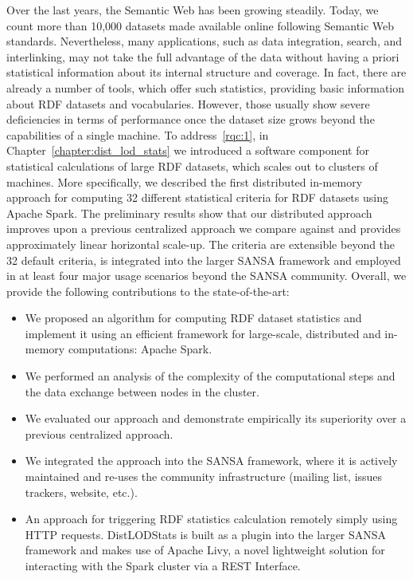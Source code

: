Over the last years, the Semantic Web has been growing steadily. 
Today, we count more than 10,000 datasets made available online following Semantic Web standards.
Nevertheless, many applications, such as data integration, search, and interlinking, may not take the full advantage of the data without having a priori statistical information about its internal structure and coverage.
In fact, there are already a number of tools, which offer such statistics, providing basic information about \gls{RDF} datasets and vocabularies.
However, those usually show severe deficiencies in terms of performance once the dataset size grows beyond the capabilities of a single machine.
To address~\ref{rqc:1}, in Chapter~\ref{chapter:dist_lod_stats} we introduced a software component for statistical calculations of large \gls{RDF} datasets, which scales out to clusters of machines.
More specifically, we described the first distributed in-memory approach for computing 32 different statistical criteria for \gls{RDF} datasets using Apache Spark.
The preliminary results show that our distributed approach improves upon a previous centralized approach we compare against and provides approximately linear horizontal scale-up. 
The criteria are extensible beyond the 32 default criteria, is integrated into the larger SANSA framework and employed in at least four major usage scenarios beyond the SANSA community.
Overall, we provide the following contributions to the state-of-the-art:

\begin{itemize}
    \item We proposed an algorithm for computing \gls{RDF} dataset statistics and implement it using an efficient framework for large-scale, distributed and in-memory computations: Apache Spark.
    \item We performed an analysis of the complexity of the computational steps and the data exchange between nodes in the cluster. 
    \item We evaluated our approach and demonstrate empirically its superiority over a previous centralized approach.
    \item We integrated the approach into the SANSA framework, where it is actively maintained and re-uses the community infrastructure (mailing list, issues trackers, website, etc.).
    \item An approach for triggering \gls{RDF} statistics calculation remotely simply using HTTP requests. 
    DistLODStats is built as a plugin into the larger SANSA framework and makes use of Apache Livy, a novel lightweight solution for interacting with the Spark cluster via a REST Interface.
\end{itemize}

